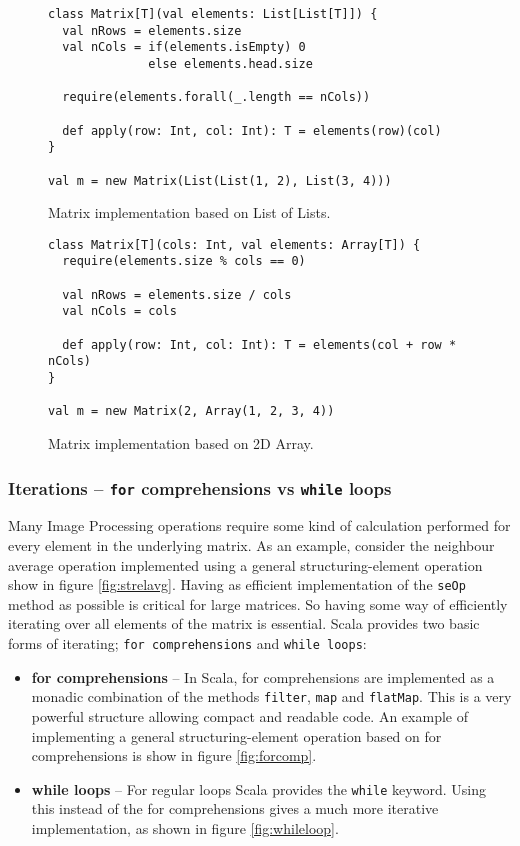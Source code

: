 \documentclass[a4paper,english]{report}
\begin{document}
\begin{figure}
  \begin{lstlisting}
class Matrix[T](val elements: List[List[T]]) {
  val nRows = elements.size
  val nCols = if(elements.isEmpty) 0
              else elements.head.size

  require(elements.forall(_.length == nCols))

  def apply(row: Int, col: Int): T = elements(row)(col)
}

val m = new Matrix(List(List(1, 2), List(3, 4)))
  \end{lstlisting}
  \caption{Matrix implementation based on List of
    Lists.\label{fig:listoflist}}
\end{figure}

\begin{figure}
  \begin{lstlisting}
class Matrix[T](cols: Int, val elements: Array[T]) {
  require(elements.size % cols == 0)

  val nRows = elements.size / cols
  val nCols = cols

  def apply(row: Int, col: Int): T = elements(col + row * nCols)
}

val m = new Matrix(2, Array(1, 2, 3, 4))
  \end{lstlisting}
  \caption{Matrix implementation based on 2D
    Array.\label{fig:2darray}}
\end{figure}

\subsubsection{Iterations -- \texttt{for} comprehensions vs \texttt{while} loops}

Many Image Processing operations require some kind of calculation
performed for every element in the underlying matrix. As an example,
consider the neighbour average operation implemented using a general
structuring-element operation show in figure
\vref{fig:strelavg}. Having as efficient implementation of the
\texttt{seOp} method as possible is critical for large matrices. So
having some way of efficiently iterating over all elements of the
matrix is essential. Scala provides two basic forms of iterating;
\texttt{for comprehensions} and \texttt{while loops}:

\begin{itemize}
\item \textbf{for comprehensions} -- In Scala, for comprehensions are
  implemented as a monadic combination of the methods \texttt{filter},
  \texttt{map} and \texttt{flatMap}. This is a very powerful structure
  allowing compact and readable code. An example of implementing a
  general structuring-element operation based on for comprehensions is
  show in figure \vref{fig:forcomp}.
\item \textbf{while loops} -- For regular loops Scala provides the
  \texttt{while} keyword. Using this instead of the for comprehensions
  gives a much more iterative implementation, as shown in figure
  \vref{fig:whileloop}.
\end{itemize}
\end{document}
